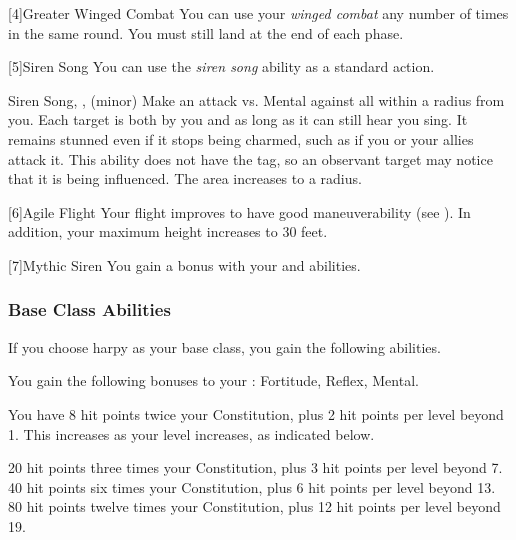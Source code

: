             [4]{Greater Winged Combat} You can use your \textit{winged combat} any number of times in the same round.
            You must still land at the end of each phase.

            [5]{Siren Song} You can use the \textit{siren song} ability as a standard action.
            \begin{magicalsustainability}{Siren Song}{, ,  (minor)}
                \rankline
                Make an attack vs. Mental against all  within a \medarea radius from you.
                \hit Each target is both \charmed by you and \stunned as long as it can still hear you sing.
                It remains stunned even if it stops being charmed, such as if you or your allies attack it.
                This ability does not have the  tag, so an observant target may notice that it is being influenced.
                \rankline
                 The area increases to a \largearea radius.
            \end{magicalsustainability}

            [6]{Agile Flight} Your flight improves to have good maneuverability (see ).
            In addition, your maximum height increases to 30 feet.

            [7]{Mythic Siren} You gain a   bonus with your  and  abilities.

        \subsubsection{Base Class Abilities}
            If you choose harpy as your base class, you gain the following abilities.

            You gain the following bonuses to your :  Fortitude,  Reflex,  Mental.

                You have 8 hit points \add twice your Constitution, plus 2 hit points per level beyond 1.
                This increases as your level increases, as indicated below.
                \begin{itemize}
                     20 hit points \add three times your Constitution, plus 3 hit points per level beyond 7.
                     40 hit points \add six times your Constitution, plus 6 hit points per level beyond 13.
                     80 hit points \add twelve times your Constitution, plus 12 hit points per level beyond 19.
                \end{itemize}

